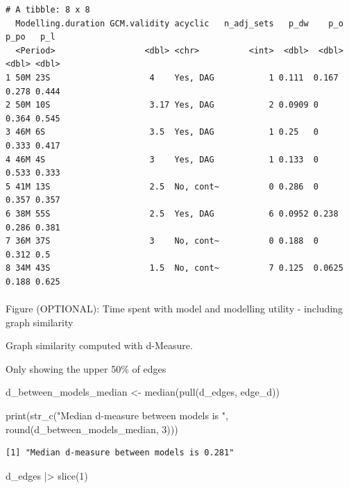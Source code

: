 \documentclass[
  letterpaper,
  DIV=11,
  numbers=noendperiod]{scrartcl}
\makeatletter
\let\oldparagraph\paragraph
\renewcommand{\paragraph}{
    \@ifstar
      \xxxParagraphStar
      \xxxParagraphNoStar
  }
\newcommand{\xxxParagraphStar}[1]{\oldparagraph*{#1}\mbox{}}
\newcommand{\xxxParagraphNoStar}[1]{\oldparagraph{#1}\mbox{}}
\newenvironment{Shaded}{\begin{snugshade}}{\end{snugshade}}
\newcommand{\DecValTok}[1]{\textcolor[rgb]{0.68,0.00,0.00}{#1}}
\newcommand{\FunctionTok}[1]{\textcolor[rgb]{0.28,0.35,0.67}{#1}}
\newcommand{\NormalTok}[1]{\textcolor[rgb]{0.00,0.23,0.31}{#1}}
\newcommand{\OtherTok}[1]{\textcolor[rgb]{0.00,0.23,0.31}{#1}}
\newcommand{\SpecialCharTok}[1]{\textcolor[rgb]{0.37,0.37,0.37}{#1}}
\newcommand{\StringTok}[1]{\textcolor[rgb]{0.13,0.47,0.30}{#1}}
\makeatother
\begin{document}
\begin{verbatim}
# A tibble: 8 x 8
  Modelling.duration GCM.validity acyclic   n_adj_sets   p_dw    p_o  p_po   p_l
  <Period>                  <dbl> <chr>          <int>  <dbl>  <dbl> <dbl> <dbl>
1 50M 23S                    4    Yes, DAG           1 0.111  0.167  0.278 0.444
2 50M 10S                    3.17 Yes, DAG           2 0.0909 0      0.364 0.545
3 46M 6S                     3.5  Yes, DAG           1 0.25   0      0.333 0.417
4 46M 4S                     3    Yes, DAG           1 0.133  0      0.533 0.333
5 41M 13S                    2.5  No, cont~          0 0.286  0      0.357 0.357
6 38M 55S                    2.5  Yes, DAG           6 0.0952 0.238  0.286 0.381
7 36M 37S                    3    No, cont~          0 0.188  0      0.312 0.5  
8 34M 43S                    1.5  No, cont~          7 0.125  0.0625 0.188 0.625
\end{verbatim}

\paragraph{Figure (OPTIONAL): Time spent with model and modelling
utility - including graph
similarity}\label{figure-optional-time-spent-with-model-and-modelling-utility---including-graph-similarity}

Graph similarity computed with d-Measure.

Only showing the upper 50\% of edges

\begin{Shaded}
\begin{Highlighting}[]
\NormalTok{d\_between\_models\_median }\OtherTok{\textless{}{-}} \FunctionTok{median}\NormalTok{(}\FunctionTok{pull}\NormalTok{(d\_edges, edge\_d))}

\FunctionTok{print}\NormalTok{(}\FunctionTok{str\_c}\NormalTok{(}\StringTok{"Median d{-}measure between models is "}\NormalTok{, }\FunctionTok{round}\NormalTok{(d\_between\_models\_median, }\DecValTok{3}\NormalTok{)))}
\end{Highlighting}
\end{Shaded}

\begin{verbatim}
[1] "Median d-measure between models is 0.281"
\end{verbatim}

\begin{Shaded}
\begin{Highlighting}[]
\NormalTok{d\_edges }\SpecialCharTok{|\textgreater{}} 
    \FunctionTok{slice}\NormalTok{(}\DecValTok{1}\NormalTok{)}
\end{Highlighting}
\end{Shaded}
\end{document}
